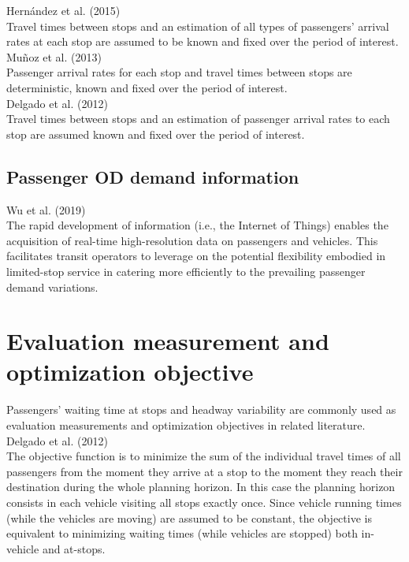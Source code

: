 \documentclass{article}
\begin{document}
\noindent Hernández et al. (2015)\\
Travel times between stops and an estimation of all types of passengers’ arrival rates at each stop 
are assumed to be known and fixed over the period of interest.\\

\noindent Muñoz et al. (2013)\\
Passenger arrival rates for each stop and travel times between stops are deterministic, known and fixed over the period of interest.\\

\noindent Delgado et al. (2012)\\
Travel times between stops and an estimation of passenger arrival rates to each stop are assumed known and fixed over the period of interest.\\

\subsection*{Passenger OD demand information}
\noindent Wu et al. (2019)\\
The rapid development of information (i.e., the Internet of Things) enables the acquisition of real-time high-resolution data on passengers and vehicles. 
This facilitates transit operators to leverage on the potential flexibility embodied in limited-stop service in catering more efficiently 
to the prevailing passenger demand variations.\\

\section{Evaluation measurement and optimization objective}
Passengers' waiting time at stops and headway variability are commonly used as evaluation measurements and optimization objectives in related literature.\\

\noindent Delgado et al. (2012)\\
The objective function is to minimize the sum of the individual travel times of all passengers 
from the moment they arrive at a stop to the moment they reach their destination during the whole planning horizon. 
In this case the planning horizon consists in each vehicle visiting all stops exactly once. 
Since vehicle running times (while the vehicles are moving) are assumed to be constant, 
the objective is equivalent to minimizing waiting times (while vehicles are stopped) both in-vehicle and at-stops.\\
\end{document}
